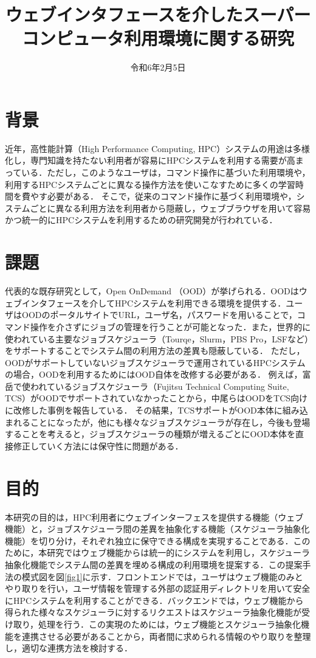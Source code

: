 \documentclass[a4paper,oneside,twocolumn,notitlepage,dvipdfmx]{jsarticle}
\date{令和6年2月5日}
\title{ウェブインタフェースを介したスーパーコンピュータ利用環境に関する研究}
\begin{document}
\maketitle
\section{背景}
近年，高性能計算（High Performance Computing, HPC）システムの用途は多様化し，専門知識を持たない利用者が容易にHPCシステムを利用する需要が高まっている．ただし，このようなユーザは，コマンド操作に基づいた利用環境や，利用するHPCシステムごとに異なる操作方法を使いこなすために多くの学習時間を費やす必要がある．
そこで，従来のコマンド操作に基づく利用環境や，システムごとに異なる利用方法を利用者から隠蔽し，ウェブブラウザを用いて容易かつ統一的にHPCシステムを利用するための研究開発が行われている．\par

\section{課題}
代表的な既存研究として，Open OnDemand （OOD）が挙げられる\cite{citation_2}\cite{citation_3}．OODはウェブインタフェースを介してHPCシステムを利用できる環境を提供する．ユーザはOODのポータルサイトでURL，ユーザ名，パスワードを用いることで，コマンド操作を介さずにジョブの管理を行うことが可能となった．また，世界的に使われている主要なジョブスケジューラ（Tourqe，Slurm，PBS Pro，LSFなど）をサポートすることでシステム間の利用方法の差異も隠蔽している．
ただし，OODがサポートしていないジョブスケジューラで運用されているHPCシステムの場合，OODを利用するためにはOOD自体を改修する必要がある．
例えば，富岳で使われているジョブスケジューラ（Fujitsu Technical Computing Suite, TCS）がOODでサポートされていなかったことから，中尾らはOODをTCS向けに改修した事例を報告している\cite{citation_1}．
その結果，TCSサポートがOOD本体に組み込まれることになったが，他にも様々なジョブスケジューラが存在し，今後も登場することを考えると，ジョブスケジューラの種類が増えるごとにOOD本体を直接修正していく方法には保守性に問題がある．\par

\section{目的}
本研究の目的は，HPC利用者にウェブインターフェスを提供する機能（ウェブ機能）と，ジョブスケジューラ間の差異を抽象化する機能（スケジューラ抽象化機能）を切り分け，それぞれ独立に保守できる構成を実現することである．このために，本研究ではウェブ機能からは統一的にシステムを利用し，スケジューラ抽象化機能でシステム間の差異を埋める構成の利用環境を提案する．この提案手法の模式図を図\ref{fig1}に示す．フロントエンドでは，ユーザはウェブ機能のみとやり取りを行い，ユーザ情報を管理する外部の認証用ディレクトリを用いて安全にHPCシステムを利用することができる．バックエンドでは，ウェブ機能から得られた様々なスケジューラに対するリクエストはスケジューラ抽象化機能が受け取り，処理を行う．この実現のためには，ウェブ機能とスケジューラ抽象化機能を連携させる必要があることから，両者間に求められる情報のやり取りを整理し，適切な連携方法を検討する．\par
\end{document}
